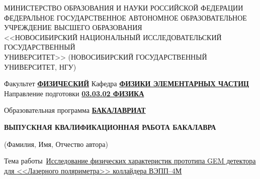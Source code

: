 \documentclass[a4paper,11pt]{extreport}
\begin{document}
	\thispagestyle{empty}
	
	\begin{center}
		МИНИСТЕРСТВО ОБРАЗОВАНИЯ И НАУКИ РОССИЙСКОЙ ФЕДЕРАЦИИ\\
		\vspace{0.3\baselineskip}
		 ФЕДЕРАЛЬНОЕ ГОСУДАРСТВЕННОЕ АВТОНОМНОЕ ОБРАЗОВАТЕЛЬНОЕ \\ 
			УЧРЕЖДЕНИЕ ВЫСШЕГО ОБРАЗОВАНИЯ \\
		\vspace{0.3\baselineskip}
		 <<НОВОСИБИРСКИЙ НАЦИОНАЛЬНЫЙ ИССЛЕДОВАТЕЛЬСКИЙ ГОСУДАРСТВЕННЫЙ \\
			УНИВЕРСИТЕТ>> (НОВОСИБИРСКИЙ ГОСУДАРСТВЕННЫЙ УНИВЕРСИТЕТ, НГУ)
	\end{center}
	\vspace{41pt}
	\noindent
	 Факультет \underline{\textbf{ФИЗИЧЕСКИЙ}}
	\vspace{11pt}
	\noindent
 	\newline Кафедра \underline{\textbf{ФИЗИКИ ЭЛЕМЕНТАРНЫХ ЧАСТИЦ}\hspace{8cm}}
	\vspace{21pt}
	\noindent
	\newline Направление подготовки \underline{\textbf{03.03.02 ФИЗИКА}}
	\vspace{11pt}
	
	\noindent
	Образовательная программа \underline{\textbf{БАКАЛАВРИАТ}}
	
	\vspace{21pt}
	\begin{center}\bfseries
		{ВЫПУСКНАЯ КВАЛИФИКАЦИОННАЯ РАБОТА БАКАЛАВРА} \\
	\end{center}
\vspace{0.3\baselineskip}

\noindent
{}
\noalign \hline
\vspace*{11pt}
\tiny{(Фамилия, Имя, Отчество автора)}

\vspace{\baselineskip}
\noindent \normalsize
\flushleft Тема работы~\underline{Исследование физических характеристик прототипа GEM детектора для \hspace{2.3cm}}\newline
\underline{<<Лазерного поляриметра>> коллайдера ВЭПП--4М\hspace{8.4cm}}
\end{document}
